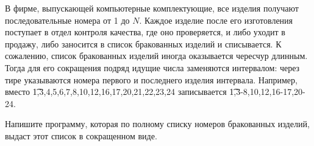 В фирме, выпускающей компьютерные комплектующие, все изделия получают последовательные номера от 1 до $N$. Каждое изделие после его изготовления поступает в отдел контроля качества, где оно проверяется, и либо уходит в продажу, либо заносится в список бракованных изделий и списывается. К сожалению, список бракованных изделий иногда оказывается чересчур длинным. Тогда для его сокращения подряд идущие числа заменяются интервалом: через тире указываются номера первого и последнего изделия интервала. Например, вместо \t{1,3,4,5,6,7,8,10,12,16,17,20,21,22,23,24} записывается \t{1,3-8,10,12,16-17,20-24}.

Напишите программу, которая по полному списку номеров бракованных изделий, выдаст этот список в сокращенном виде. 
